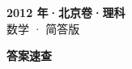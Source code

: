 \documentclass[zihao=-4, a4paper]{ctexart}
\begin{document}
\begin{center}
  {\Large\bfseries 2012 年·北京卷·理科}\\[4pt]
  {\large 数学 · 简答版}
\end{center}
\medskip
{}

\clearpage
{}
\begin{center}{\Large\bfseries 答案速查}\end{center}
\medskip

\end{document}
